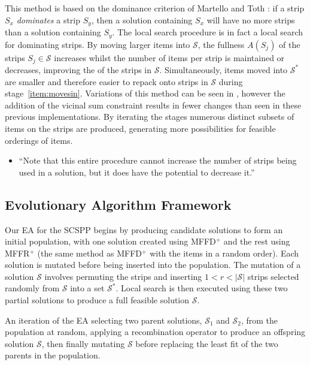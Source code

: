 \documentclass{elsarticle}
\begin{document}
This method is based on the dominance criterion of Martello and Toth \cite{martello1990l}: if a strip $S_x$ \emph{dominates} a strip $S_y$, then a solution containing $S_x$ will have no more strips than a solution containing $S_y$. The local search procedure is in fact a local search for dominating strips. By moving larger items into $\mathcal{S}$, the fullness $A(S_j)$ of the strips  $S_j \in \mathcal{S}$ increases whilst the number of items per strip is maintained or decreases, improving the  of the strips in $\mathcal{S}$. Simultaneously, items moved into $\mathcal{S}^*$ are smaller and therefore easier to repack onto strips in $\mathcal{S}$ during stage~\ref{item:movesin}. Variations of this method can be seen in \cite{lewis2009, lewis2017, falkenauer1996, levine2004}, however the addition of the vicinal sum constraint results in fewer changes than seen in these previous implementations. By iterating the stages numerous distinct subsets of items on the strips are produced, generating more possibilities for feasible orderings of items.

{\color{myRed}
\begin{itemize}[leftmargin=*]
	\item ``Note that this entire procedure cannot increase the number of strips being used in a solution, but it does have the potential to decrease it.''
\end{itemize}
}

\subsection{Evolutionary Algorithm Framework}
\label{sub:eaframework}
\noindent Our EA for the SCSPP begins by producing candidate solutions to form an initial population, with one solution created using MFFD$^+$ and the rest using MFFR$^+$ (the same method as MFFD$^+$ with the items in a random order). Each solution is mutated before being inserted into the population. The mutation of a solution $\mathcal{S}$ involves permuting the strips and inserting $1 < r < |\mathcal{S}|$ strips selected randomly from $\mathcal{S}$ into a set $\mathcal{S}^*$. Local search is then executed using these two partial solutions to produce a full feasible solution $\mathcal{S}$. 

An iteration of the EA  selecting two parent solutions, $\mathcal{S}_1$ and $\mathcal{S}_2$, from the population at random, applying a recombination operator to produce an offspring solution $\mathcal{S}$, then finally mutating $\mathcal{S}$ before replacing the least fit of the two parents in the population.
\end{document}

